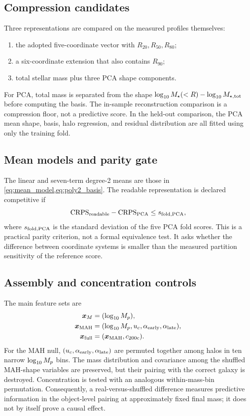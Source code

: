 \subsection{Compression candidates}

Three representations are compared on the measured profiles themselves:
\begin{enumerate}
  \item the adopted five-coordinate vector with $R_{20},R_{50},R_{80}$;
  \item a six-coordinate extension that also contains $R_{90}$;
  \item total stellar mass plus three PCA shape components.
\end{enumerate}
For PCA, total mass is separated from the shape
$\log_{10} M_\star(<R)-\log_{10} M_{\star,\rm tot}$ before computing the basis. The
in-sample reconstruction comparison is a compression floor, not a predictive
score. In the held-out comparison, the PCA mean shape, basis, halo regression,
and residual distribution are all fitted using only the training fold.

\subsection{Mean models and parity gate}

The linear and seven-term degree-2 means are those in
\cref{eq:mean_model,eq:poly2_basis}. The readable representation is declared
competitive if
\begin{equation}
  \mathrm{CRPS}_{\rm readable}-\mathrm{CRPS}_{\rm PCA}
  \leq s_{\rm fold,PCA},
  \label{eq:exp50_gate}
\end{equation}
where $s_{\rm fold,PCA}$ is the standard deviation of the five PCA fold scores.
This is a practical parity criterion, not a formal equivalence test. It asks
whether the difference between coordinate systems is smaller than the measured
partition sensitivity of the reference score.

\subsection{Assembly and concentration controls}

The main feature sets are
\begin{align}
  \bm{x}_{M} &= (\log_{10} M_p),\\
  \bm{x}_{\rm MAH} &= (\log_{10} M_p,u_c,\alpha_{\rm early},\alpha_{\rm late}),\\
  \bm{x}_{\rm full} &= (\bm{x}_{\rm MAH},c_{200\mathrm{c}}).
\end{align}
For the MAH null, $(u_c,\alpha_{\rm early},\alpha_{\rm late})$ are permuted
together among halos in ten narrow $\log_{10} M_p$ bins. The mass distribution
and covariance among the shuffled MAH-shape variables are preserved, but their
pairing with the correct galaxy is destroyed. Concentration is tested with an
analogous within-mass-bin permutation. Consequently, a real-versus-shuffled
difference measures predictive information in the object-level pairing at
approximately fixed final mass; it does not by itself prove a causal effect.

